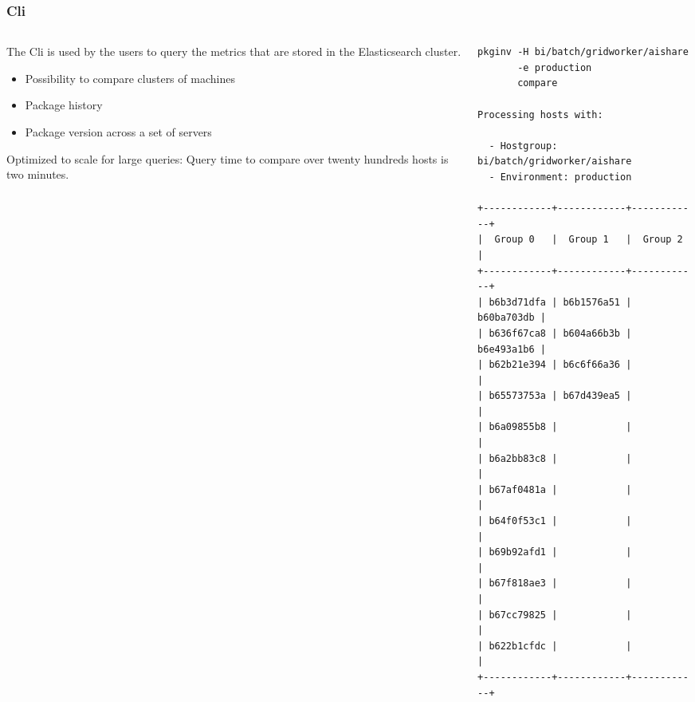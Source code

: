\documentclass[aspectratio=169]{beamer}
\begin{document}
\begin{frame}[fragile]
    \frametitle{Cli}
    \begin{minipage}[t]{0.95\textwidth}
        \begin{columns}
        \begin{column}{0.5\textwidth}
            The Cli is used by the users to query the metrics that are
            stored in the  Elasticsearch cluster.

            \begin{itemize}
                \item Possibility to compare clusters of machines
                \item Package history
                \item Package version across a set of servers
            \end{itemize}

            Optimized to scale for large queries:
            Query time to compare over twenty hundreds hosts is two minutes.
        \end{column}
        \begin{column}{0.5\textwidth}
            \linespread{1px}
            \begin{verbatim}
pkginv -H bi/batch/gridworker/aishare
       -e production
       compare

Processing hosts with:

  - Hostgroup: bi/batch/gridworker/aishare
  - Environment: production

+------------+------------+------------+
|  Group 0   |  Group 1   |  Group 2   |
+------------+------------+------------+
| b6b3d71dfa | b6b1576a51 | b60ba703db |
| b636f67ca8 | b604a66b3b | b6e493a1b6 |
| b62b21e394 | b6c6f66a36 |            |
| b65573753a | b67d439ea5 |            |
| b6a09855b8 |            |            |
| b6a2bb83c8 |            |            |
| b67af0481a |            |            |
| b64f0f53c1 |            |            |
| b69b92afd1 |            |            |
| b67f818ae3 |            |            |
| b67cc79825 |            |            |
| b622b1cfdc |            |            |
+------------+------------+------------+
            \end{verbatim}
        \end{column}
        \end{columns}
    \end{minipage}
\end{frame}
\end{document}
